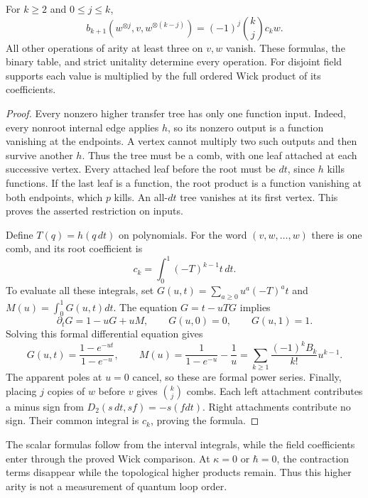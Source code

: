 \begin{proposition}
\label{prop:interval-bernoulli-operations}
For $k\ge2$ and $0\le j\le k$,
\begin{equation*}
 b_{k+1}(w^{\otimes j},v,w^{\otimes(k-j)})
 =(-1)^j\binom{k}{j}c_k w.
\end{equation*}
All other operations of arity at least three on $v,w$ vanish.
These formulas, the binary table, and strict unitality determine every
operation.  For disjoint field supports each value is multiplied by the
full ordered Wick product of its coefficients.
\end{proposition}
\begin{proof}
Every nonzero higher transfer tree has only one function input.
Indeed, every nonroot internal edge applies $h$, so its nonzero output
is a function vanishing at the endpoints.  A vertex cannot multiply
two such outputs and then survive another $h$.  Thus the tree must
be a comb, with one leaf attached at each successive vertex.  Every
attached leaf before the root must be $dt$, since $h$ kills functions.
If the last leaf is a function, the root product is a function
vanishing at both endpoints, which $p$ kills.  An all-$dt$ tree vanishes
at its first vertex.  This proves the asserted restriction on inputs.

Define $T(q)=h(q\,dt)$ on polynomials.  For the word
$(v,w,\ldots,w)$ there is one comb, and its root coefficient is
\[
 c_k=\int_0^1(-T)^{k-1}t\,dt.
\]
To evaluate all these integrals, set
$G(u,t)=\sum_{a\ge0}u^a(-T)^a t$ and
$M(u)=\int_0^1G(u,t)dt$.  The equation $G=t-uTG$ implies
\[
 \partial_tG=1-uG+uM,\qquad G(u,0)=0,\qquad G(u,1)=1.
\]
Solving this formal differential equation gives
\[
 G(u,t)=\frac{1-e^{-ut}}{1-e^{-u}},\qquad
 M(u)=\frac1{1-e^{-u}}-\frac1u
 =\sum_{k\ge1}\frac{(-1)^kB_k}{k!}u^{k-1}.
\]
The apparent poles at $u=0$ cancel, so these are formal power series.
Finally, placing $j$ copies of $w$ before $v$ gives
$\binom{k}{j}$ combs.  Each left attachment contributes a minus sign
from $D_2(s\,dt,sf)=-s(fdt)$.  Right attachments contribute no sign.
Their common integral is $c_k$, proving the formula.
\end{proof}

The scalar formulas follow from the interval integrals, while the
field coefficients enter through the proved Wick comparison.
At $\kappa=0$ or $\hbar=0$, the contraction terms disappear while the
topological higher products remain.  Thus this higher arity is not a
measurement of quantum loop order.

